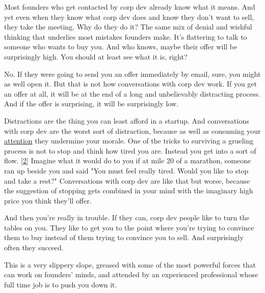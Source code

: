Most founders who get contacted by corp dev
                  already know what it means. And yet even when they know what
                  corp dev does and know they don't want to sell, they take the
                  meeting. Why do they do it? The same mix of denial and wishful
                  thinking that underlies most mistakes founders make. It's
                  flattering to talk to someone who wants to buy you. And who
                  knows, maybe their offer will be surprisingly high. You should
                  at least see what it is, right?

No. If they were
                  going to send you an offer immediately by email, sure, you
                  might as well open it. But that is not how conversations with
                  corp dev work. If you get an offer at all, it will be at the
                  end of a long and unbelievably distracting process. And if the
                  offer is surprising, it will be surprisingly low.

Distractions
                  are the thing you can least afford in a startup. And
                  conversations with corp dev are the worst sort of distraction,
                  because as well as consuming your
                  \href{http://www.paulgraham.com/top.html}{attention} they undermine your morale.
                  One of the tricks to surviving a grueling process is not to
                  stop and think how tired you are. Instead you get into a sort
                  of flow.
                  [\href{\#f2n}{2}]
                  Imagine what it would do to you if at mile 20 of a marathon,
                  someone ran up beside you and said "You must feel really
                  tired. Would you like to stop and take a rest?" Conversations
                  with corp dev are like that but worse, because the suggestion
                  of stopping gets combined in your mind with the imaginary high
                  price you think they'll offer.

And then you're
                  really in trouble. If they can, corp dev people like to turn
                  the tables on you. They like to get you to the point where
                  you're trying to convince them to buy instead of them trying
                  to convince you to sell. And surprisingly often they
                  succeed.

This is a very slippery slope, greased
                  with some of the most powerful forces that can work on
                  founders' minds, and attended by an experienced professional
                  whose full time job is to push you down it.

